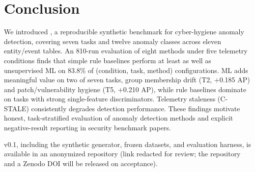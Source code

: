 
\section{Conclusion}
\label{sec:conclusion}

We introduced \hygienebench, a reproducible synthetic benchmark for cyber-hygiene
anomaly detection, covering seven tasks and twelve anomaly classes across eleven
entity/event tables. An 810-run evaluation of eight methods under five telemetry
conditions finds that simple rule baselines perform at least as well as unsupervised
ML on 83.8\% of (condition, task, method) configurations. ML adds meaningful value
on two of seven tasks, group membership drift (T2, $+$0.185 AP) and
patch/vulnerability hygiene (T5, $+$0.210 AP), while rule baselines dominate on
tasks with strong single-feature discriminators. Telemetry staleness (C-STALE)
consistently degrades detection performance. These findings motivate honest,
task-stratified evaluation of anomaly detection methods and explicit negative-result
reporting in security benchmark papers.

\hygienebench v0.1, including the synthetic generator, frozen datasets, and
evaluation harness, is available in an anonymized repository (link redacted for
review; the repository and a Zenodo DOI will be released on acceptance).
